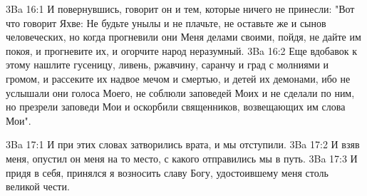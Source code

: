 \vs 3Ba 16:1
И повернувшись, говорит он и тем, которые ничего не принесли: "Вот что говорит Яхве: Не будьте унылы и не плачьте, не оставьте же и сынов человеческих, но когда прогневили они Меня делами своими, пойдя, не дайте им покоя, и прогневите их, и огорчите народ неразумный.
\vs 3Ba 16:2
Еще вдобавок к этому нашлите гусеницу, ливень, ржавчину, саранчу и град с молниями и громом, и рассеките их надвое мечом и смертью, и детей их демонами, ибо не услышали они голоса Моего, не соблюли заповедей Моих и не сделали по ним, но презрели заповеди Мои и оскорбили священников, возвещающих им слова Мои".

\vs 3Ba 17:1
И при этих словах затворились врата, и мы отступили.
\vs 3Ba 17:2
И взяв меня, опустил он меня на то место, с какого отправились мы в путь.
\vs 3Ba 17:3
И придя в себя, принялся я возносить славу Богу, удостоившему меня столь великой чести.
